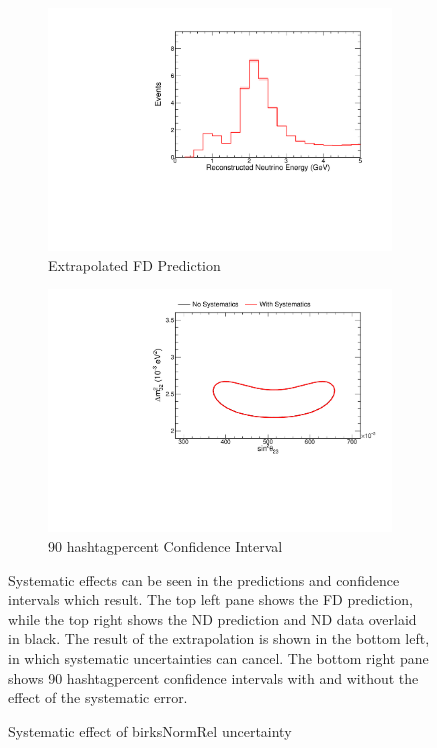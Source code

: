 {\begin{figure}
\begin{center}
\begin{subfigure}[c]{0.49\textwidth}
\includegraphics[width=\textwidth]{figures/systs/prediction/fd_extrap_prediction_birksNormRel.pdf}
\caption*{Extrapolated FD Prediction}
\end{subfigure}
\begin{subfigure}[c]{0.49\textwidth}
\includegraphics[width=\textwidth]{figures/systs/prediction/fd_extrap_contour_birksNormRel.pdf}
\caption*{90 hashtagpercent Confidence Interval}
\end{subfigure}
\end{center}
\caption{Systematic effect of birksNormRel uncertainty}{
Systematic effects can be seen in the predictions and confidence intervals
which result.
The top left pane shows the FD prediction, while the top right shows the
ND prediction and ND data overlaid in black.
The result of the extrapolation is shown in the bottom left, in which
systematic uncertainties can cancel.
The bottom right pane shows 90 hashtagpercent confidence intervals with and without
the effect of the systematic error.}
\label{syst_fig_birksNormRel}


\end{figure}}

